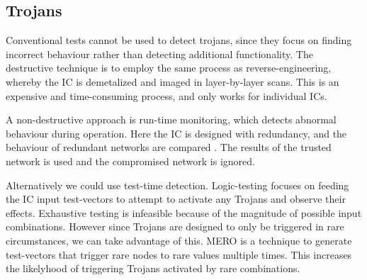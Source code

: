 \documentclass{IEEEtran}
\begin{document}






\subsection{Trojans}

Conventional tests cannot be used to detect trojans, since they focus on finding incorrect behaviour rather than detecting additional functionality. The destructive technique is to employ the same process as reverse-engineering, whereby the IC is demetalized and imaged in layer-by-layer scans. This is an expensive and time-consuming process, and only works for individual ICs.

A non-destructive approach is run-time monitoring, which detects abnormal behaviour during operation. Here the IC is designed with redundancy, and the behaviour of redundant networks are compared  \cite{tehranipoor2011introduction}.   The results of the trusted network is used and the compromised network is ignored.

Alternatively we could use test-time detection. Logic-testing focuses on feeding the IC input test-vectors to attempt to activate any Trojans and observe their effects. Exhaustive testing is infeasible because of the magnitude of possible input combinations. However since Trojans are designed to only be triggered in rare circumstances, we can take advantage of this.  MERO is a technique to generate test-vectors that trigger rare nodes to rare values multiple times. This increases the likelyhood of triggering Trojans activated by rare combinations.
\end{document}
